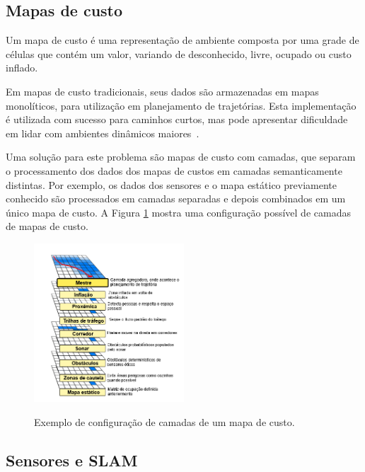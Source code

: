 \documentclass[repeatfields,xlists,xpacks,oneside,yearsonly]{ufrgscca}
\begin{document}
\subsection{Mapas de custo}

Um mapa de custo é uma representação de ambiente composta por uma
grade de células que contém um valor, variando de desconhecido, livre,
ocupado ou custo inflado.

Em mapas de custo tradicionais, seus dados são armazenadas em mapas monolíticos,
para utilização em planejamento de trajetórias.
Esta implementação é utilizada com sucesso para caminhos curtos,
mas pode apresentar dificuldade em lidar com ambientes dinâmicos
maiores~\cite{layered_costmaps}.

Uma solução para este problema são mapas de custo com camadas,
que separam o processamento dos dados dos mapas de custos em camadas semanticamente distintas.
Por exemplo, os dados dos sensores e o mapa estático previamente conhecido são processados
em camadas separadas e depois combinados em um único mapa de custo.
A Figura \ref{fig:mapa_camadas} mostra uma configuração possível de camadas
de mapas de custo.

\begin{figure}[h]
    {
        \centering
        \caption{Exemplo de configuração de camadas de um mapa de custo.}
        \label{fig:mapa_camadas}
        \includegraphics[width=0.5\textwidth]{mapa_camadas_trad.png}\\
    }
    {}
\end{figure}
\subsection{Sensores e SLAM}
\end{document}
